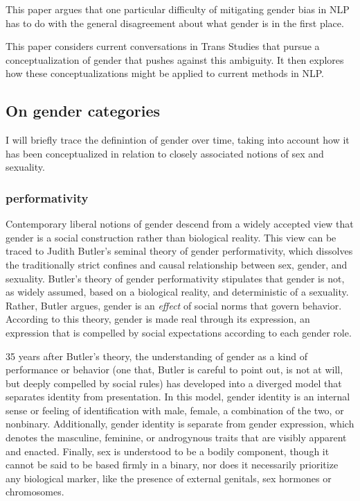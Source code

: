 \documentclass[11pt]{article}
\begin{document}
This paper argues that one particular difficulty of mitigating gender
bias in NLP has to do with the general disagreement about what gender
is in the first place.

This paper considers current conversations in Trans Studies that
pursue a conceptualization of gender that pushes against this
ambiguity. It then explores how these conceptualizations might be
applied to current methods in NLP.

\subsection{On gender categories}
\label{sec:orgdaf1e11}
I will briefly trace the definintion of gender over time, taking into
account how it has been conceptualized in relation to closely
associated notions of sex and sexuality. 

\subsubsection{performativity}
\label{sec:orgc08fd8d}
Contemporary liberal notions of gender descend from a widely accepted
view that gender is a social construction rather than biological
reality. This view can be traced to Judith Butler's seminal theory of
gender performativity, which dissolves the traditionally strict
confines and causal relationship between sex, gender, and sexuality.
Butler's theory of gender performativity stipulates that gender is
not, as widely assumed, based on a biological reality, and
deterministic of a sexuality. Rather, Butler argues, gender is an
\emph{effect} of social norms that govern behavior. According to this
theory, gender is made real through its expression, an expression that
is compelled by social expectations according to each gender role.

35 years after Butler's theory, the understanding of gender as a kind
of performance or behavior (one that, Butler is careful to point out,
is not at will, but deeply compelled by social rules) has developed
into a diverged model that separates identity from presentation. In
this model, gender identity is an internal sense or feeling of
identification with male, female, a combination of the two, or
nonbinary. Additionally, gender identity is separate from gender
expression, which denotes the masculine, feminine, or androgynous
traits that are visibly apparent and enacted. Finally, sex is
understood to be a bodily component, though it cannot be said to be
based firmly in a binary, nor does it necessarily prioritize any
biological marker, like the presence of external genitals, sex
hormones or chromosomes.
\end{document}
